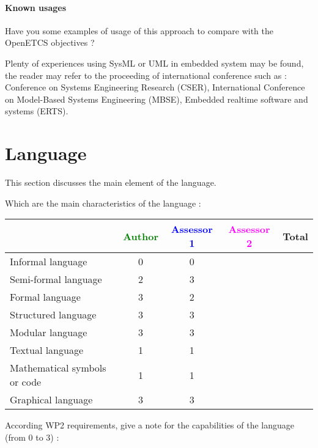 \paragraph{Known usages} Have you some examples of usage of this
approach to  compare with the OpenETCS objectives ?

Plenty of experiences using SysML or UML in embedded system may be
found, the reader may refer to the proceeding of international
conference such as : Conference on Systems Engineering
Research (CSER), International Conference on Model-Based Systems Engineering
(MBSE), Embedded realtime software and systems (ERTS).
 

\section{Language}
This section discusses the main element of the language.

Which are the main characteristics of the language :

\begin{tabular}{|l | c | c | c | c|}
\hline
& \textcolor{green}{Author} & \textcolor{blue}{Assessor 1} & \textcolor{magenta}{Assessor 2} & Total \\
\hline 
Informal language & 0 & 0 & &  \\
\hline 
Semi-formal language & 2 & 3 & &  \\
\hline
Formal language & 3 & 2 & &  \\
\hline
Structured language &3 & 3 & & \\
\hline
Modular language &3 & 3 & & \\
\hline
Textual language & 1 & 1 & & \\
\hline
Mathematical symbols or code &1 & 1 & & \\
\hline
Graphical language &3 & 3 & & \\
\hline
\end{tabular}

According WP2 requirements, give a note for the capabilities of the language (from 0 to 3) :

